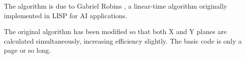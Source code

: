 The algorithm is due to Gabriel Robins \cite{robins87}, a linear-time
algorithm originally implemented in LISP for AI applications.

The original algorithm has been modified so that both X and Y planes
are calculated simultaneously, increasing efficiency slightly. The basic
code is only a page or so long.


%


%
\setfooter{\thepage}{}{}{}{}{\thepage}
\printindex

